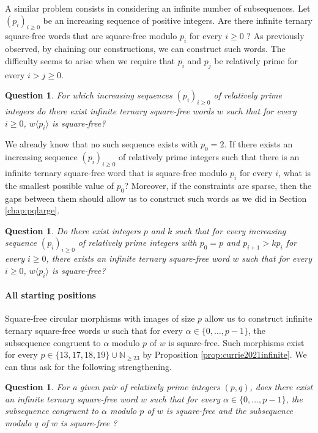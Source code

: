 \documentclass[12pt]{article}
\newtheorem{question}[theorem]{Question}
\theoremstyle{definition}
\newcommand{\subsequence}[2]{#1\langle#2\rangle}
\begin{document}
A similar problem consists in considering an infinite number of subsequences. Let $(p_i)_{i \ge 0}$ be an increasing sequence of positive integers. Are there infinite ternary square-free words that are square-free modulo $p_i$ for every $i \geq 0$ ?
As previously observed, by chaining our constructions, we can construct such words. The difficulty seems to arise when we require that $p_i$ and $p_j$ be relatively prime for every $i > j \ge 0$.
\begin{question}
For which increasing sequences $(p_i)_{i \ge 0}$ of relatively prime integers do there exist infinite ternary square-free words $w$ such that for every $i \geq 0$, $\subsequence{w}{p_i}$ is square-free?
\end{question}

We already know that no such sequence exists with $p_0 = 2$. If there exists an increasing sequence $(p_i)_{i \ge 0}$ of relatively prime integers such that there is an infinite ternary square-free word that is square-free modulo $p_i$ for every $i$, what is the smallest possible value of $p_0$? Moreover, if the constraints are sparse, then the gaps between them should allow us to construct such words as we did in Section \ref{chap:pqlarge}.
\begin{question}
Do there exist integers $p$ and $k$ such that for every increasing sequence $(p_i)_{i \ge 0}$ of relatively prime integers with $p_0 = p$ and $p_{i+1} > kp_i$ for every $i \ge 0$, there exists an infinite ternary square-free word $w$ such that for every $i \geq 0$, $\subsequence{w}{p_i}$ is square-free?
\end{question}

\paragraph{All starting positions}
Square-free circular morphisms with images of size $p$ allow us to construct infinite ternary square-free words $w$ such that for every $\alpha \in \{0, \dots, p - 1\}$, the subsequence congruent to $\alpha$ modulo $p$ of $w$ is square-free. Such morphisms exist for every $p \in \{13, 17, 18, 19\} \cup \mathbb{N}_{\geq 23}$ by Proposition \ref{prop:currie2021infinite}. We can thus ask for the following strengthening.
\begin{question}
 For a given pair of relatively prime integers $(p, q)$, does there exist an infinite ternary square-free word $w$ such that for every $\alpha \in \{0, \dots, p - 1\}$, the subsequence congruent to $\alpha$ modulo $p$ of $w$ is square-free and the subsequence modulo $q$ of $w$ is square-free ?
\end{question}
\end{document}
